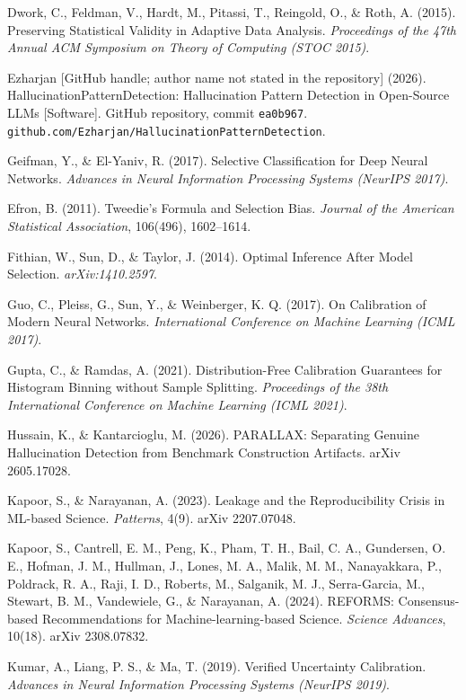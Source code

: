 \documentclass{article}
\begin{document}
Dwork, C., Feldman, V., Hardt, M., Pitassi, T., Reingold, O., \& Roth, A.
(2015). Preserving Statistical Validity in Adaptive Data Analysis.
\emph{Proceedings of the 47th Annual ACM Symposium on Theory of Computing
(STOC 2015)}.

Ezharjan [GitHub handle; author name not stated in the repository]
(2026). HallucinationPatternDetection: Hallucination Pattern
Detection in Open-Source LLMs [Software]. GitHub repository, commit
\texttt{ea0b967}.
\texttt{github.com/Ezharjan/\allowbreak HallucinationPatternDetection}.

Geifman, Y., \& El-Yaniv, R. (2017). Selective Classification for Deep
Neural Networks. \emph{Advances in Neural Information Processing Systems
(NeurIPS 2017)}.

Efron, B. (2011). Tweedie's Formula and Selection Bias. \emph{Journal of the
American Statistical Association}, 106(496), 1602--1614.

Fithian, W., Sun, D., \& Taylor, J. (2014). Optimal Inference After Model
Selection. \emph{arXiv:1410.2597}.

Guo, C., Pleiss, G., Sun, Y., \& Weinberger, K. Q. (2017). On Calibration
of Modern Neural Networks. \emph{International Conference on Machine
Learning (ICML 2017)}.

Gupta, C., \& Ramdas, A. (2021). Distribution-Free Calibration Guarantees for
Histogram Binning without Sample Splitting. \emph{Proceedings of the 38th
International Conference on Machine Learning (ICML 2021)}.

Hussain, K., \& Kantarcioglu, M. (2026). PARALLAX: Separating Genuine
Hallucination Detection from Benchmark Construction Artifacts.
arXiv 2605.17028.

Kapoor, S., \& Narayanan, A. (2023). Leakage and the Reproducibility
Crisis in ML-based Science. \emph{Patterns}, 4(9). arXiv 2207.07048.

Kapoor, S., Cantrell, E. M., Peng, K., Pham, T. H., Bail, C. A., Gundersen,
O. E., Hofman, J. M., Hullman, J., Lones, M. A., Malik, M. M., Nanayakkara, P.,
Poldrack, R. A., Raji, I. D., Roberts, M., Salganik, M. J., Serra-Garcia, M.,
Stewart, B. M., Vandewiele, G., \& Narayanan, A. (2024). REFORMS:
Consensus-based Recommendations for
Machine-learning-based Science. \emph{Science Advances}, 10(18). arXiv 2308.07832.

Kumar, A., Liang, P. S., \& Ma, T. (2019). Verified Uncertainty
Calibration. \emph{Advances in Neural Information Processing Systems
(NeurIPS 2019)}.
\end{document}
